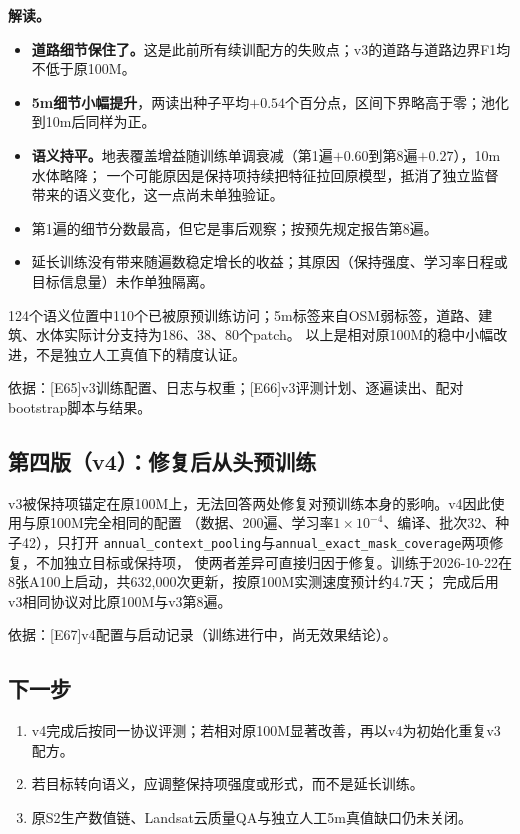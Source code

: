 \documentclass[UTF8,fontset=fandol,zihao=5,a4paper]{ctexart}
\newcommand{\source}[1]{\par{\footnotesize\color{muted}依据：#1}\par}
\begin{document}
\textbf{解读。}
\begin{itemize}
\item \textbf{道路细节保住了。}这是此前所有续训配方的失败点；v3的道路与道路边界F1均不低于原100M。
\item \textbf{5m细节小幅提升}，两读出种子平均$+0.54$个百分点，区间下界略高于零；池化到10m后同样为正。
\item \textbf{语义持平。}地表覆盖增益随训练单调衰减（第1遍$+0.60$到第8遍$+0.27$），10m水体略降；
一个可能原因是保持项持续把特征拉回原模型，抵消了独立监督带来的语义变化，这一点尚未单独验证。
\item 第1遍的细节分数最高，但它是事后观察；按预先规定报告第8遍。
\item 延长训练没有带来随遍数稳定增长的收益；其原因（保持强度、学习率日程或目标信息量）未作单独隔离。
\end{itemize}
124个语义位置中110个已被原预训练访问；5m标签来自OSM弱标签，道路、建筑、水体实际计分支持为186、38、80个patch。
以上是相对原100M的稳中小幅改进，不是独立人工真值下的精度认证。
\source{[E65]v3训练配置、日志与权重；[E66]v3评测计划、逐遍读出、配对bootstrap脚本与结果。}

\subsection{第四版（v4）：修复后从头预训练}
v3被保持项锚定在原100M上，无法回答两处修复对预训练本身的影响。v4因此使用与原100M完全相同的配置
（数据、200遍、学习率$1\times10^{-4}$、编译、批次32、种子42），只打开
\texttt{annual\_context\_pooling}与\texttt{annual\_exact\_mask\_coverage}两项修复，不加独立目标或保持项，
使两者差异可直接归因于修复。训练于2026-10-22在8张A100上启动，共632,000次更新，按原100M实测速度预计约4.7天；
完成后用v3相同协议对比原100M与v3第8遍。
\source{[E67]v4配置与启动记录（训练进行中，尚无效果结论）。}

\subsection{下一步}
\begin{enumerate}
\item v4完成后按同一协议评测；若相对原100M显著改善，再以v4为初始化重复v3配方。
\item 若目标转向语义，应调整保持项强度或形式，而不是延长训练。
\item 原S2生产数值链、Landsat云质量QA与独立人工5m真值缺口仍未关闭\cite{landsatqa}。
\end{enumerate}
\end{document}

